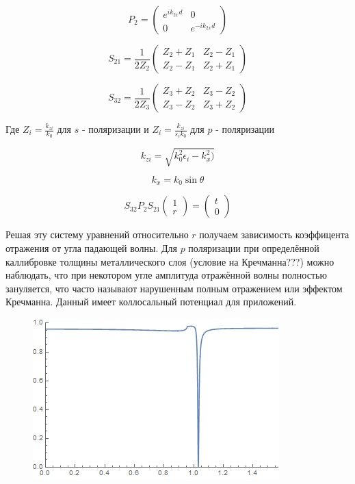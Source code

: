 $$P_{2}=\left(\begin{array}{cc}
e^{i k_{2 x} d} & 0 \\
0 & e^{-i k_{2 x} d}
\end{array}\right)$$



$$
S_{21} = 
\frac{1}{2 Z_2}\begin{pmatrix}
	Z_2+Z_1 & Z_2 -Z_1 \\
	Z_2-Z_1 & Z_2+Z_1
\end{pmatrix}
$$


$$
S_{32} = 
\frac{1}{2 Z_3}\begin{pmatrix}
Z_3+Z_2 & Z_3 -Z_2 \\
Z_3-Z_2 & Z_3+Z_2
\end{pmatrix}
$$

Где $Z_i = \frac{k_{zi}}{k_0}$ для $ s $ - поляризации и $Z_i = \frac{k_{zi}}{\varepsilon_i k_0}$ для $ p $ - поляризации 

$$
 k_{zi} = \sqrt{k_0^2 \epsilon_i - k_x^2)}
$$

$$
 k_{x} = k_0 \sin{ \theta}
$$


$$
S_{32} P_2 S_{21} \begin{pmatrix}
	1\\
	r 
\end{pmatrix} = 
\begin{pmatrix}
t\\
0 
\end{pmatrix}
$$


Решая эту систему уравнений относительно $ r $ получаем зависимость коэффицента отражения от угла падающей волны. Для $ p $ поляризации при определённой каллибровке толщины металлического слоя (условие на Кречманна???)
можно наблюдать, что при некотором угле амплитуда отражённой волны полностью зануляется, что часто называют нарушенным полным отражением или эффектом Кречманна.
Данный имеет коллосальный потенциал для приложений.

\begin{figure}[h!]
	\centering
	\includegraphics[width=0.7\linewidth]{kretchmann}
	\caption[Эффект Кречмана]{}
	\label{fig:kretchmann}
\end{figure}



